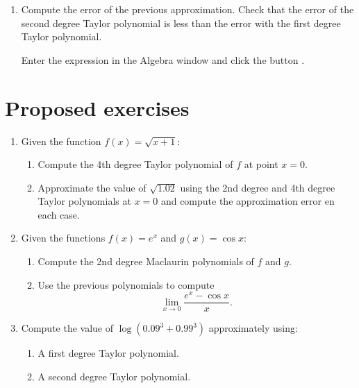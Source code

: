 \begin{enumerate}[leftmargin=*]
\begin{enumerate}
\item Compute the error of the previous approximation. 
Check that the error of the second degree Taylor polynomial is less than the error with the first degree Taylor polynomial. 
\begin{indication}
Enter the expression  in the Algebra window and click the button .
\end{indication}
\end{enumerate}
\end{enumerate}


\section{Proposed exercises}

\begin{enumerate}[leftmargin=*]
\item Given the function $f(x)=\sqrt{x+1}$:
\begin{enumerate}
\item Compute the 4th degree Taylor polynomial of $f$ at point $x=0$.
\item Approximate the value of $\sqrt{1.02}$ using the 2nd degree and 4th degree Taylor polynomials at $x=0$ and compute the approximation error en each case.
\end{enumerate}

\item Given the functions $f(x)=e^x$ and $g(x)=\cos x$:
\begin{enumerate}
\item Compute the 2nd degree Maclaurin polynomials of $f$ and $g$.
\item Use the previous polynomials to compute 
\[ \lim_{x\rightarrow 0}\frac{e^x-\cos x}{x}.\]
\end{enumerate}

\item Compute the value of $\log(0.09^3+0.99^3)$ approximately using:
\begin{enumerate}
\item A first degree Taylor polynomial.
\item A second degree Taylor polynomial.
\end{enumerate}
\end{enumerate}
